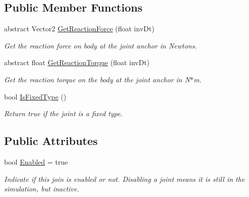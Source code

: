 \subsection*{Public Member Functions}
\begin{DoxyCompactItemize}
\item 
abstract Vector2 \hyperlink{class_farseer_physics_1_1_dynamics_1_1_joints_1_1_joint_aa9468be64f5c857ee67eb0a7337e3f58}{Get\+Reaction\+Force} (float inv\+Dt)
\begin{DoxyCompactList}\small\item\em Get the reaction force on body at the joint anchor in Newtons. \end{DoxyCompactList}\item 
abstract float \hyperlink{class_farseer_physics_1_1_dynamics_1_1_joints_1_1_joint_a21899d3bdf15c22ef4dc288ed2082cbc}{Get\+Reaction\+Torque} (float inv\+Dt)
\begin{DoxyCompactList}\small\item\em Get the reaction torque on the body at the joint anchor in N$\ast$m. \end{DoxyCompactList}\item 
bool \hyperlink{class_farseer_physics_1_1_dynamics_1_1_joints_1_1_joint_abfa904f80fd61465cb31c73faa347247}{Is\+Fixed\+Type} ()
\begin{DoxyCompactList}\small\item\em Return true if the joint is a fixed type. \end{DoxyCompactList}\end{DoxyCompactItemize}
\subsection*{Public Attributes}
\begin{DoxyCompactItemize}
\item 
bool \hyperlink{class_farseer_physics_1_1_dynamics_1_1_joints_1_1_joint_a8ef109de7c22718a74fc79e3fca543ea}{Enabled} = true
\begin{DoxyCompactList}\small\item\em Indicate if this join is enabled or not. Disabling a joint means it is still in the simulation, but inactive. \end{DoxyCompactList}\end{DoxyCompactItemize}
